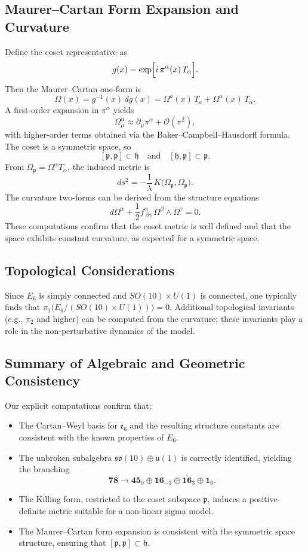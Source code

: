 \documentclass[aps,prd,preprint,groupedaddress]{revtex4-2}
\begin{document}
\subsection{Maurer–Cartan Form Expansion and Curvature}
Define the coset representative as
\[
g(x) = \exp\Bigl[i\,\pi^\alpha(x)\,T_\alpha\Bigr].
\]
Then the Maurer–Cartan one-form is
\[
\Omega(x) = g^{-1}(x)\,d g(x) = \Omega^a(x)\,T_a + \Omega^\alpha(x)\,T_\alpha.
\]
A first-order expansion in \(\pi^\alpha\) yields
\[
\Omega^\alpha_\mu \approx \partial_\mu \pi^\alpha + \mathcal{O}(\pi^2),
\]
with higher-order terms obtained via the Baker–Campbell–Hausdorff formula. The coset is a symmetric space, so
\[
[\mathfrak{p},\mathfrak{p}] \subset \mathfrak{h} \quad \text{and} \quad [\mathfrak{h},\mathfrak{p}] \subset \mathfrak{p}.
\]
From \(\Omega_{\mathfrak{p}} = \Omega^\alpha T_\alpha\), the induced metric is
\[
ds^2 = -\frac{1}{\lambda}\, K\bigl(\Omega_{\mathfrak{p}},\Omega_{\mathfrak{p}}\bigr).
\]
The curvature two-forms can be derived from the structure equations
\[
d\Omega^\alpha + \frac{1}{2} f^\alpha_{\ \beta\gamma}\, \Omega^\beta\wedge \Omega^\gamma = 0.
\]
These computations confirm that the coset metric is well defined and that the space exhibits constant curvature, as expected for a symmetric space.

\subsection{Topological Considerations}
Since \(E_6\) is simply connected and \(SO(10)\times U(1)\) is connected, one typically finds that \(\pi_1\bigl(E_6/(SO(10)\times U(1))\bigr)=0\). Additional topological invariants (e.g., \(\pi_2\) and higher) can be computed from the curvature; these invariants play a role in the non-perturbative dynamics of the model.

\subsection{Summary of Algebraic and Geometric Consistency}
Our explicit computations confirm that:
\begin{itemize}
  \item The Cartan--Weyl basis for \(\mathfrak{e}_6\) and the resulting structure constants are consistent with the known properties of \(E_6\).
  \item The unbroken subalgebra \(\mathfrak{so}(10)\oplus \mathfrak{u}(1)\) is correctly identified, yielding the branching
    \[
    \mathbf{78} \to \mathbf{45}_0 \oplus \mathbf{16}_{-3} \oplus \overline{\mathbf{16}}_{3} \oplus \mathbf{1}_0.
    \]
  \item The Killing form, restricted to the coset subspace \(\mathfrak{p}\), induces a positive-definite metric suitable for a non-linear sigma model.
  \item The Maurer–Cartan form expansion is consistent with the symmetric space structure, ensuring that \([\mathfrak{p},\mathfrak{p}]\subset\mathfrak{h}\).
\end{itemize}
\end{document}
